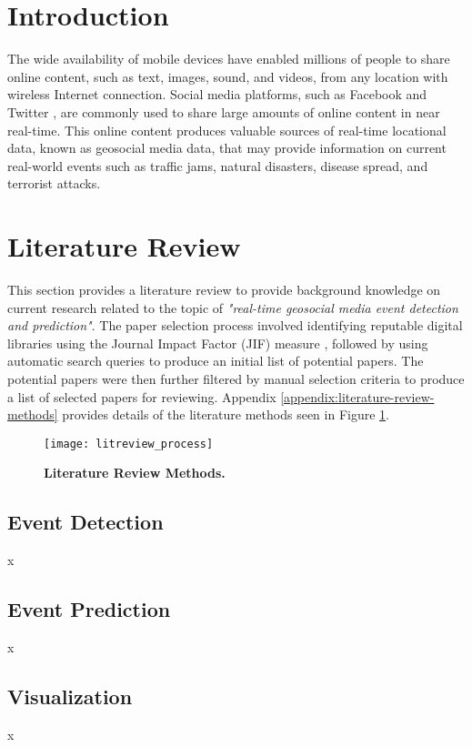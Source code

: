 



\section{Introduction} \label{introduction}

The wide availability of mobile devices have enabled millions of people to share online content, such as text, images, sound, and videos, from any location with wireless Internet connection. Social media platforms, such as Facebook \citep{Facebook:2017} and Twitter \citep{Twitter:2017}, are commonly used to share large amounts of online content in near real-time. This online content produces valuable sources of real-time locational data, known as geosocial media data, that may provide information on current real-world events such as traffic jams, natural disasters, disease spread, and terrorist attacks. 




\section{Literature Review} \label{literature-review}

This section provides a literature review to provide background knowledge on current research related to the topic of \textit{"real-time geosocial media event detection and prediction"}. The paper selection process involved identifying reputable digital libraries using the Journal Impact Factor (JIF) measure \citep{Garfield:2006b}, followed by using automatic search queries to produce an initial list of potential papers. The potential papers were then further filtered by manual selection criteria to produce a list of selected papers for reviewing. Appendix \ref{appendix:literature-review-methods} provides details of the literature methods seen in Figure \ref{figure:litreview_process}.

\begin{figure}[!htb]
	\centering
	\texttt{[image: litreview\_process]}
	\caption{\textbf{Literature Review Methods.}}
	\label{figure:litreview_process}
\end{figure}

\subsection{Event Detection} \label{event-detection-methods}

x

\subsection{Event Prediction} \label{event-detection-methods}

x

\subsection{Visualization} \label{event-detection-methods}

x